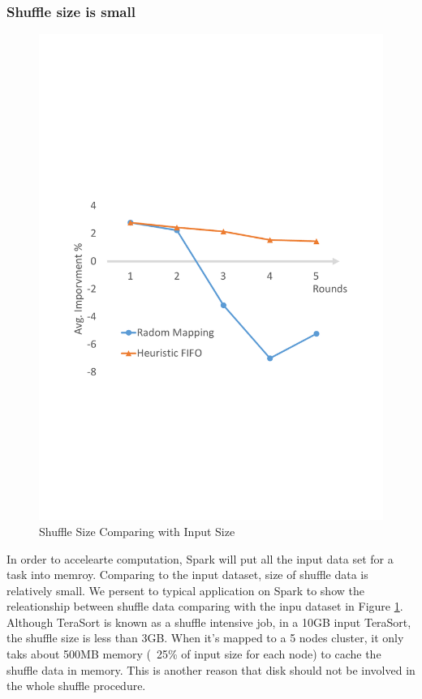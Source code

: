 \documentclass[10pt,twocolumn]{article}
\begin{document}
\subsubsection{Shuffle size is small}
	\begin{figure}
	\includegraphics[width=\linewidth]{fig/shuffle_size}
	\caption{Shuffle Size Comparing with Input Size}
	\label{fig:shuffle_size}
\end{figure}
In order to accelearte computation, Spark will put all the input data set for a task into memroy. Comparing to the input dataset, size of shuffle data is relatively small. We persent to typical application on Spark to show the releationship between shuffle data comparing with the inpu dataset in Figure \ref{fig:shuffle_size}. Although TeraSort\cite{terasort} is known as a shuffle intensive job, in a 10GB input TeraSort, the shuffle size is less than 3GB. When it's mapped to a 5 nodes cluster, it only taks about 500MB memory (~25\% of input size for each node) to cache the shuffle data in memory. This is another reason that disk should not be involved in the whole shuffle procedure.
\end{document}
